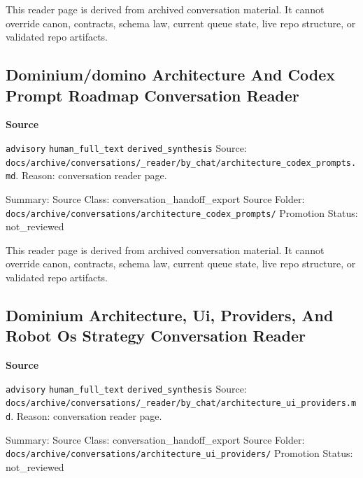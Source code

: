 \documentclass[9pt,a4paper,openany]{book}
\newcommand{\vonecallout}[3]{\par\medskip\noindent\begingroup\setlength{\fboxsep}{7pt}\colorbox{DomCalloutBg}{\parbox{0.94\linewidth}{\textbf{\textcolor{#1}{#2}}\par #3}}\endgroup\par\medskip}
\begin{document}
This reader page is derived from archived conversation material.\allowbreak{} It cannot override canon, contracts, schema law, current queue state, live repo structure, or validated repo artifacts.\allowbreak{}



\subsection{Dominium/domino Architecture And Codex Prompt Roadmap Conversation Reader}

\vonecallout{DomSlate}{Source}{\texttt{advisory} \texttt{human\_\allowbreak{}full\_\allowbreak{}text} \texttt{derived\_\allowbreak{}synthesis} Source: \texttt{docs/\allowbreak{}archive/\allowbreak{}conversations/\allowbreak{}\_\allowbreak{}reader/\allowbreak{}by\_\allowbreak{}chat/\allowbreak{}architecture\_\allowbreak{}codex\_\allowbreak{}prompts.\allowbreak{}md}.\allowbreak{} Reason: conversation reader page.\allowbreak{}}

Summary: Source Class: conversation\_\allowbreak{}handoff\_\allowbreak{}export Source Folder: \texttt{docs/\allowbreak{}archive/\allowbreak{}conversations/\allowbreak{}architecture\_\allowbreak{}codex\_\allowbreak{}prompts/\allowbreak{}} Promotion Status: not\_\allowbreak{}reviewed


This reader page is derived from archived conversation material.\allowbreak{} It cannot override canon, contracts, schema law, current queue state, live repo structure, or validated repo artifacts.\allowbreak{}



\subsection{Dominium Architecture, Ui, Providers, And Robot Os Strategy Conversation Reader}

\vonecallout{DomSlate}{Source}{\texttt{advisory} \texttt{human\_\allowbreak{}full\_\allowbreak{}text} \texttt{derived\_\allowbreak{}synthesis} Source: \texttt{docs/\allowbreak{}archive/\allowbreak{}conversations/\allowbreak{}\_\allowbreak{}reader/\allowbreak{}by\_\allowbreak{}chat/\allowbreak{}architecture\_\allowbreak{}ui\_\allowbreak{}providers.\allowbreak{}md}.\allowbreak{} Reason: conversation reader page.\allowbreak{}}

Summary: Source Class: conversation\_\allowbreak{}handoff\_\allowbreak{}export Source Folder: \texttt{docs/\allowbreak{}archive/\allowbreak{}conversations/\allowbreak{}architecture\_\allowbreak{}ui\_\allowbreak{}providers/\allowbreak{}} Promotion Status: not\_\allowbreak{}reviewed
\end{document}
